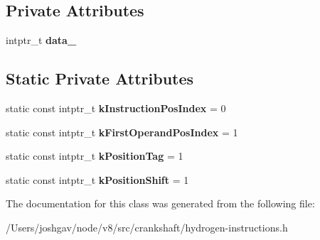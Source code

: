 \subsection*{Private Attributes}
\begin{DoxyCompactItemize}
\item 
intptr\+\_\+t {\bfseries data\+\_\+}\hypertarget{classv8_1_1internal_1_1_h_position_info_aa0173f1c2d814a67e3ffbcfe8c9d05fa}{}\label{classv8_1_1internal_1_1_h_position_info_aa0173f1c2d814a67e3ffbcfe8c9d05fa}

\end{DoxyCompactItemize}
\subsection*{Static Private Attributes}
\begin{DoxyCompactItemize}
\item 
static const intptr\+\_\+t {\bfseries k\+Instruction\+Pos\+Index} = 0\hypertarget{classv8_1_1internal_1_1_h_position_info_a127e703df854f37aa4b2c1f734989bb4}{}\label{classv8_1_1internal_1_1_h_position_info_a127e703df854f37aa4b2c1f734989bb4}

\item 
static const intptr\+\_\+t {\bfseries k\+First\+Operand\+Pos\+Index} = 1\hypertarget{classv8_1_1internal_1_1_h_position_info_af7c5c285f961d93d14e1edbe026b41e3}{}\label{classv8_1_1internal_1_1_h_position_info_af7c5c285f961d93d14e1edbe026b41e3}

\item 
static const intptr\+\_\+t {\bfseries k\+Position\+Tag} = 1\hypertarget{classv8_1_1internal_1_1_h_position_info_a205d6294214cd3bcd750847903e93482}{}\label{classv8_1_1internal_1_1_h_position_info_a205d6294214cd3bcd750847903e93482}

\item 
static const intptr\+\_\+t {\bfseries k\+Position\+Shift} = 1\hypertarget{classv8_1_1internal_1_1_h_position_info_a789c9b64e1e7315c103c1bdd15f00aa5}{}\label{classv8_1_1internal_1_1_h_position_info_a789c9b64e1e7315c103c1bdd15f00aa5}

\end{DoxyCompactItemize}


The documentation for this class was generated from the following file\+:\begin{DoxyCompactItemize}
\item 
/\+Users/joshgav/node/v8/src/crankshaft/hydrogen-\/instructions.\+h\end{DoxyCompactItemize}
